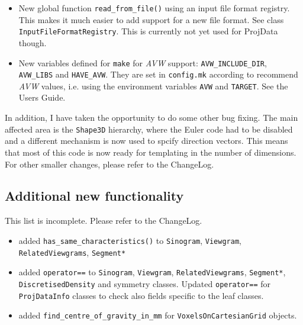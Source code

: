 \documentclass{article}
\begin{document}
\begin{itemize}
\item New global function \texttt{read\_from\_file()} using an input file format 
registry. This makes it much easier to add support for a new file format. See
class \texttt{InputFileFormatRegistry}. This is currently not yet used for ProjData though.

\item New variables defined for \texttt{make} for \textit{AVW} support:
\texttt{AVW\_INCLUDE\_DIR}, \texttt{AVW\_LIBS} and \texttt{HAVE\_AVW}. They
are set in \texttt{config.mk} according to recommend \textit{AVW} values,
i.e. using the environment variables \texttt{AVW} and \texttt{TARGET}.
See the Users Guide.
\end{itemize}

In addition, I have taken the opportunity to do some other bug fixing.
The main affected area is the \texttt{Shape3D} hierarchy, where the 
Euler code had to be disabled and a different mechanism is now used to
spcify direction vectors. This means that most of this code is now
ready for templating in the number of dimensions. For other smaller
changes, please refer to the ChangeLog.

\subsection{Additional new functionality}
This list is incomplete. Please refer to the ChangeLog.
\begin{itemize}
\item added \texttt{has\_same\_characteristics()} to \texttt{Sinogram}, \texttt{Viewgram}, 
       \texttt{RelatedViewgrams}, \texttt{Segment*}
\item added \texttt{operator==} to \texttt{Sinogram}, \texttt{Viewgram}, 
       \texttt{RelatedViewgrams}, \texttt{Segment*}, \texttt{DiscretisedDensity} 
       and symmetry classes. Updated \texttt{operator==} for \texttt{ProjDataInfo}
       classes to check also fields specific to the leaf classes.
\item added \texttt{find\_centre\_of\_gravity\_in\_mm} for \texttt{VoxelsOnCartesianGrid} objects.
\end{itemize}
\end{document}
